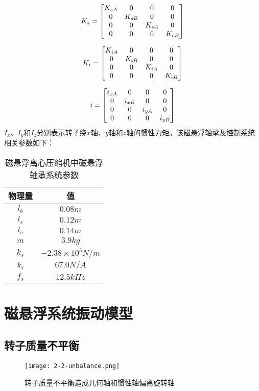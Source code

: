 $${K_s} = \left[ {\begin{matrix}
   {{K_{sA}}} & 0 & 0 & 0  \cr 
   0 & {{K_{sB}}} & 0 & 0  \cr 
   0 & 0 & {{K_{sA}}} & 0  \cr 
   0 & 0 & 0 & {{K_{sB}}}  \cr 

 \end{matrix} } \right]$$

$${K_i} = \left[ {\begin{matrix}
   {{K_{iA}}} & 0 & 0 & 0  \cr 
   0 & {{K_{iB}}} & 0 & 0  \cr 
   0 & 0 & {{K_{iA}}} & 0  \cr 
   0 & 0 & 0 & {{K_{iB}}}  \cr 

 \end{matrix} } \right]$$

$${i} = \left[ {\begin{matrix}
   {{i_{xA}}} & 0 & 0 & 0  \cr 
   0 & {{i_{xB}}} & 0 & 0  \cr 
   0 & 0 & {{i_{yA}}} & 0  \cr 
   0 & 0 & 0 & {{i_{yB}}}  \cr 

 \end{matrix} } \right]$$
$ I_x $、$ I_y $和$I_z$分别表示转子绕$ x $轴、$ y $轴和$ z $轴的惯性力矩。该磁悬浮轴承及控制系统相关参数如下：
\begin{table}[htb]
  \caption[磁悬浮离心压缩机中磁悬浮轴承系统参数]{磁悬浮离心压缩机中磁悬浮轴承系统参数\label{tab:bearing_para}}
  \begin{tabular}{cc}
    \toprule
    物理量 & 值 \\
    \midrule
    $l_b$ & $0.08m$ \\
    $l_s$ & $0.12m$ \\
    $l_c$ & $0.14m$ \\
    $m$	  & $3.9kg$ \\
    $k_s$ & $-2.38\times 10^5N/m$\\
    $k_i$ & $67.0N/A$\\
    $f_s$ & $12.5kHz$\\   
    \bottomrule
  \end{tabular}
\end{table}



\section{磁悬浮系统振动模型}
\subsection{转子质量不平衡}
\begin{figure}
	\texttt{[image: 2-2-unbalance.png]}
	\caption{转子质量不平衡造成几何轴和惯性轴偏离旋转轴}
	\label{fig:2-2-unbalance}
\end{figure}

